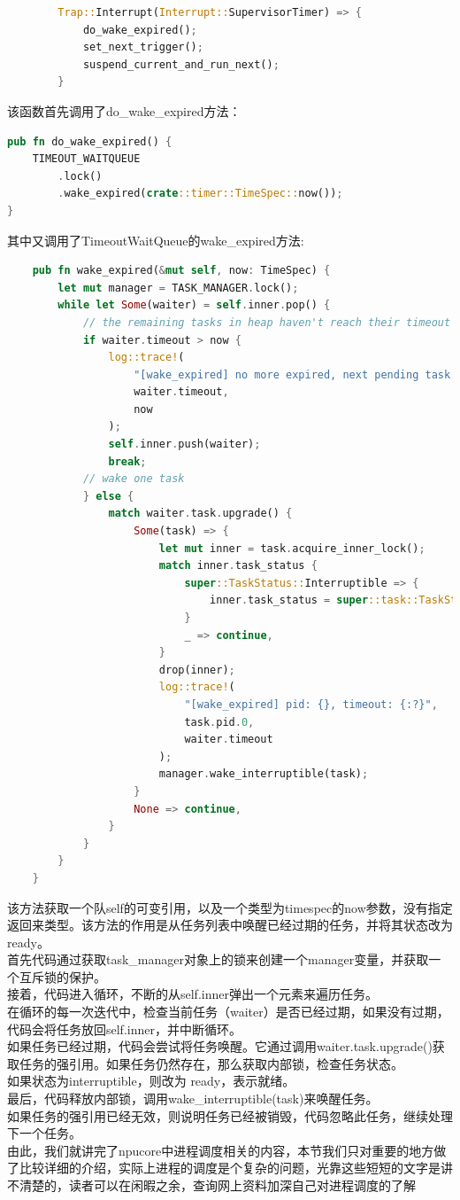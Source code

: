 \begin{lstlisting}[language=rust]
            Trap::Interrupt(Interrupt::SupervisorTimer) => {
            do_wake_expired();
            set_next_trigger();
            suspend_current_and_run_next();
        }
\end{lstlisting}
该函数首先调用了do_wake_expired方法：
\begin{lstlisting}[language=rust]
    pub fn do_wake_expired() {
    TIMEOUT_WAITQUEUE
        .lock()
        .wake_expired(crate::timer::TimeSpec::now());
}
\end{lstlisting}
其中又调用了TimeoutWaitQueue的wake_expired方法:
\begin{lstlisting}[language=rust]
        pub fn wake_expired(&mut self, now: TimeSpec) {
        let mut manager = TASK_MANAGER.lock();
        while let Some(waiter) = self.inner.pop() {
            // the remaining tasks in heap haven't reach their timeout
            if waiter.timeout > now {
                log::trace!(
                    "[wake_expired] no more expired, next pending task timeout: {:?}, now: {:?}",
                    waiter.timeout,
                    now
                );
                self.inner.push(waiter);
                break;
            // wake one task
            } else {
                match waiter.task.upgrade() {
                    Some(task) => {
                        let mut inner = task.acquire_inner_lock();
                        match inner.task_status {
                            super::TaskStatus::Interruptible => {
                                inner.task_status = super::task::TaskStatus::Ready
                            }
                            _ => continue,
                        }
                        drop(inner);
                        log::trace!(
                            "[wake_expired] pid: {}, timeout: {:?}",
                            task.pid.0,
                            waiter.timeout
                        );
                        manager.wake_interruptible(task);
                    }
                    None => continue,
                }
            }
        }
    }
\end{lstlisting}
该方法获取一个队self的可变引用，以及一个类型为timespec的now参数，没有指定返回来类型。该方法的作用是从任务列表中唤醒已经过期的任务，并将其状态改为ready。
\\[10pt]
首先代码通过获取task_manager对象上的锁来创建一个manager变量，并获取一个互斥锁的保护。\\
接着，代码进入循环，不断的从self.inner弹出一个元素来遍历任务。\\
在循环的每一次迭代中，检查当前任务（waiter）是否已经过期，如果没有过期，代码会将任务放回self.inner，并中断循环。\\
如果任务已经过期，代码会尝试将任务唤醒。它通过调用waiter.task.upgrade()获取任务的强引用。如果任务仍然存在，那么获取内部锁，检查任务状态。\\
如果状态为interruptible，则改为 ready，表示就绪。\\
最后，代码释放内部锁，调用wake_interruptible(task)来唤醒任务。\\
如果任务的强引用已经无效，则说明任务已经被销毁，代码忽略此任务，继续处理下一个任务。
\\[10pt]

由此，我们就讲完了npucore中进程调度相关的内容，本节我们只对重要的地方做了比较详细的介绍，实际上进程的调度是个复杂的问题，光靠这些短短的文字是讲不清楚的，读者可以在闲暇之余，查询网上资料加深自己对进程调度的了解





